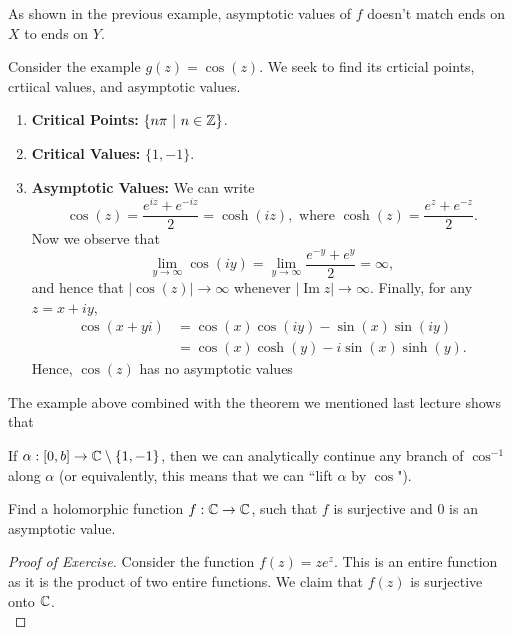 \documentclass{article}
\begin{document}
{\begin{remark}
    As shown in the previous example, asymptotic values of $f$ doesn't match ends on $X$ to ends on $Y$.
\end{remark}

\begin{example}
    Consider the example $g(z) = \cos (z)$. We seek to find its crticial points, crtiical values, and asymptotic values.
    \begin{enumerate}
        \item \textbf{Critical Points:} $\{n \pi \ |\ n \in \mathbb{Z}\}$.
        \item \textbf{Critical Values:} $\{1, -1\}$.
        \item \textbf{Asymptotic Values:} We can write
        \[\cos(z) = \frac{e^{iz} + e^{-iz}}{2} = \cosh(iz), \text{ where } \cosh(z) = \frac{e^z + e^{-z}}{2}.\]
        Now we observe that
        \[\lim_{y \to \infty} \cos(iy) = \lim_{y \to \infty} \frac{e^{-y} + e^y}{2} = \infty,\]
        and hence that $|\cos(z)| \to \infty$ whenever $|\operatorname{Im} z| \to \infty$. Finally, for any $z = x + iy$,
        \begin{align*}
            \cos(x + yi) &= \cos(x) \cos(iy) - \sin(x) \sin(iy)\\
            &= \cos(x) \cosh(y) - i \sin(x) \sinh(y).
        \end{align*}
        Hence, $\cos(z)$ has no asymptotic values 
    \end{enumerate}
\end{example}

The example above combined with the theorem we mentioned last lecture shows that
\begin{theorem}
    If $\alpha: [0, b] \to \mathbb{C} \setminus \{1, -1\}$, then we can analytically continue any branch of $\cos^{-1}$ along $\alpha$ (or equivalently, this means that we can ``lift $\alpha$ by $\cos$").
\end{theorem}

\begin{exercise}
    Find a holomorphic function $f: \mathbb{C} \to \mathbb{C}$, such that $f$ is surjective and $0$ is an asymptotic value.
\end{exercise}

\begin{proof}[Proof of Exercise]
Consider the function $f(z) = z e^{z}$. This is an entire function as it is the product of two entire functions. We claim that $f(z)$ is surjective onto $\mathbb{C}$.\\


\end{proof}}
\end{document}
